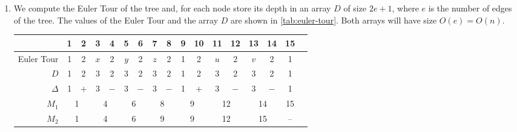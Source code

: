 \begin{enumerate}

  \item We compute the Euler Tour of the tree and, for each node store its depth
  in an array $D$ of size $2e + 1$, where $e$ is the number of edges of the
  tree. The values of the Euler Tour and the array $D$ are shown in
  \autoref{tab:euler-tour}. Both arrays will have size $O(e) = O(n)$.
  \begin{table}[t]
    \centering
    \begin{tabular}{|r||c|c|c|c|c|c|c|c|c|c|c|c|c|c|c|c|}
      \multicolumn{1}{c}{} & \multicolumn{1}{c}{\tiny 1} &
      \multicolumn{1}{c}{\tiny 2} & \multicolumn{1}{c}{\tiny 3} &
      \multicolumn{1}{c}{\tiny 4} & \multicolumn{1}{c}{\tiny 5} &
      \multicolumn{1}{c}{\tiny 6} & \multicolumn{1}{c}{\tiny 7} &
      \multicolumn{1}{c}{\tiny 8} & \multicolumn{1}{c}{\tiny 9} &
      \multicolumn{1}{c}{\tiny 10} & \multicolumn{1}{c}{\tiny 11} &
      \multicolumn{1}{c}{\tiny 12} & \multicolumn{1}{c}{\tiny 13} &
      \multicolumn{1}{c}{\tiny 14} & \multicolumn{1}{c}{\tiny 15} \\\hline
      Euler Tour & 1 & 2 & $x$ & 2 & $y$ & 2 & $z$ & 2 & 1 & 2 & $u$ & 2 & $v$ & 2 & 1 \\\hline
             $D$ & 1 & 2 & 3 & 2 & 3 & 2 & 3 & 2 & 1 & 2 & 3 & 2 & 3 & 2 & 1 \\\hline\hline
        $\Delta$ & \multicolumn{1}{c}{1} & \multicolumn{1}{c|}{$+$} &
                   \multicolumn{1}{c}{3} & \multicolumn{1}{c|}{$-$} &
                   \multicolumn{1}{c}{3} & \multicolumn{1}{c|}{$-$} &
                   \multicolumn{1}{c}{3} & \multicolumn{1}{c|}{$-$} &
                   \multicolumn{1}{c}{1} & \multicolumn{1}{c|}{$+$} &
                   \multicolumn{1}{c}{3} & \multicolumn{1}{c|}{$-$} &
                   \multicolumn{1}{c}{3} & \multicolumn{1}{c|}{$-$} &
                   \multicolumn{1}{c|}{1} \\\hline
           $M_1$ & \multicolumn{2}{c|}{1} & \multicolumn{2}{c|}{4} &
                   \multicolumn{2}{c|}{6} & \multicolumn{2}{c|}{8} &
                   \multicolumn{2}{c|}{9} & \multicolumn{2}{c|}{12} &
                   \multicolumn{2}{c|}{14} & \multicolumn{1}{c|}{15} \\
           $M_2$ & \multicolumn{2}{c|}{1} & \multicolumn{2}{c|}{4} &
                   \multicolumn{2}{c|}{6} & \multicolumn{2}{c|}{9} &
                   \multicolumn{2}{c|}{9} & \multicolumn{2}{c|}{12} &
                   \multicolumn{2}{c|}{15} & \multicolumn{1}{c|}{--} \\

\end{tabular}
\end{table}
\end{enumerate}
